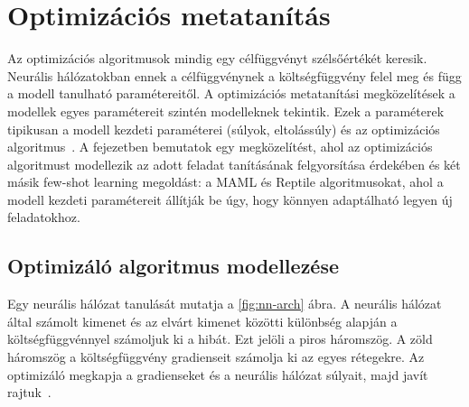 \section{Optimizációs metatanítás}

Az optimizációs algoritmusok mindig egy célfüggvényt szélsőértékét keresik. Neurális
hálózatokban ennek a célfüggvénynek a költségfüggvény felel meg és függ a modell tanulható paramétereitől. A optimizációs metatanítási megközelítések a modellek egyes paramétereit szintén modelleknek tekintik. Ezek a paraméterek tipikusan a modell kezdeti paraméterei (súlyok, eltolássúly) és az optimizációs algoritmus~\cite{meta_learning_summarize}.
\newline
\newline
A fejezetben bemutatok egy megközelítést, ahol az optimizációs algoritmust modellezik az adott feladat tanításának felgyorsítása érdekében és két másik few-shot learning megoldást: a MAML és Reptile algoritmusokat, ahol a modell kezdeti paramétereit állítják be úgy, hogy könnyen adaptálható legyen új feladatokhoz.

\subsection{Optimizáló algoritmus modellezése}

Egy neurális hálózat tanulását mutatja a \ref{fig:nn-arch} ábra. A neurális hálózat által számolt kimenet és az elvárt kimenet közötti különbség alapján a költségfüggvénnyel számoljuk ki a hibát. Ezt jelöli a piros háromszög. A zöld háromszög a költségfüggvény gradienseit számolja ki az egyes rétegekre. Az optimizáló megkapja a gradienseket és a neurális hálózat súlyait, majd javít rajtuk~\cite{optimization_modeling}.

